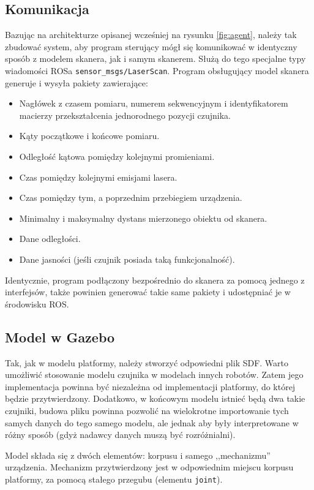 	\subsection{Komunikacja}
		Bazując na architekturze opisanej wcześniej na rysunku \ref{fig:agent}, należy tak zbudować system, aby program sterujący mógł się komunikować w identyczny sposób z 
		modelem skanera, jak i samym skanerem.
		Służą do tego specjalne typy wiadomości ROSa \texttt{sensor\_msgs/LaserScan}.
		Program obsługujący model skanera generuje i wysyła pakiety zawierające:
		\begin{itemize}
			\item Nagłówek z czasem pomiaru, numerem sekwencyjnym i identyfikatorem macierzy przekształcenia jednorodnego pozycji czujnika.
			\item Kąty początkowe i końcowe pomiaru.
			\item Odległość kątowa pomiędzy kolejnymi promieniami.
			\item Czas pomiędzy kolejnymi emisjami lasera.
			\item Czas pomiędzy tym, a poprzednim przebiegiem urządzenia.
			\item Minimalny i maksymalny dystans mierzonego obiektu od skanera.
			\item Dane odległości.
			\item Dane jasności (jeśli czujnik posiada taką funkcjonalność).
		\end{itemize}

		Identycznie, program podłączony bezpośrednio do skanera za pomocą jednego z interfejsów, także powinien generować takie same pakiety i udostępniać je w środowisku ROS.
		
	\subsection{Model w Gazebo}
		Tak, jak w modelu platformy, należy stworzyć odpowiedni plik SDF. 
		Warto umożliwić stosowanie modelu czujnika w modelach innych robotów. 
		Zatem jego implementacja powinna być niezależna od implementacji platformy, do której będzie przytwierdzony.
		Dodatkowo, w końcowym modelu istnieć będą dwa takie czujniki, budowa pliku powinna pozwolić na wielokrotne importowanie tych samych danych do tego samego modelu, 
		ale jednak aby były interpretowane w różny sposób (gdyż nadawcy danych muszą być rozróżnialni).

		Model składa się z dwóch elementów: korpusu i samego ,,mechanizmu'' urządzenia.
		Mechanizm przytwierdzony jest w odpowiednim miejscu korpusu platformy, za pomocą stałego przegubu (elementu \texttt{joint}).


